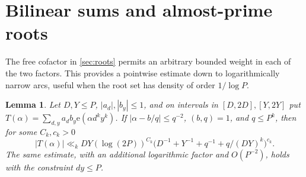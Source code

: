 \documentclass[11pt,letterpaper]{article}
\newtheorem{lemma}[lemma]{Lemma}
\theoremstyle{definition}
\newcommand{\e}{\mathrm e}
\begin{document}
\section{Bilinear sums and almost-prime roots}\label{sec:bilinear}
The free cofactor in \cref{sec:roots} permits an arbitrary bounded
weight in each of the two factors. This provides a pointwise estimate
down to logarithmically narrow arcs, useful when the root set has
density of order $1/\log P$.
\begin{lemma}\label{lem:type2}
Let $D,Y\le P$, $|a_d|,|b_y|\le1$, and on intervals in
$[D,2D],[Y,2Y]$ put $T(\alpha)=\sum_{d,y}a_db_y\e(\alpha d^ky^k)$.
If $|\alpha-b/q|\le q^{-2}$, $(b,q)=1$, and $q\le P^k$, then
for some $C_k,c_k>0$
\[
 |T(\alpha)|\ll_k DY(\log(2P))^{C_k}
 \bigl(D^{-1}+Y^{-1}+q^{-1}+q/(DY)^k\bigr)^{c_k}.
\]
The same estimate, with an additional logarithmic factor and
$O(P^{-2})$, holds with the constraint $dy\le P$.
\end{lemma}
\end{document}
